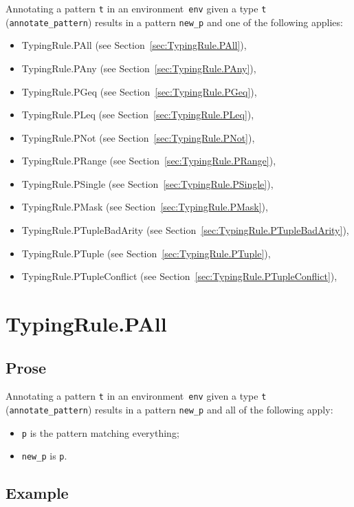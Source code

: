 \documentclass{book}
\begin{document}
Annotating a pattern \texttt{t} in an environment~\texttt{env} given a type \texttt{t} (\texttt{annotate\_pattern}) results in a pattern \texttt{new\_p} and one of the following applies:
\begin{itemize}
\item TypingRule.PAll (see Section~\ref{sec:TypingRule.PAll}),
\item TypingRule.PAny (see Section~\ref{sec:TypingRule.PAny}),
\item TypingRule.PGeq (see Section~\ref{sec:TypingRule.PGeq}),
\item TypingRule.PLeq (see Section~\ref{sec:TypingRule.PLeq}),
\item TypingRule.PNot (see Section~\ref{sec:TypingRule.PNot}),
\item TypingRule.PRange (see Section~\ref{sec:TypingRule.PRange}),
\item TypingRule.PSingle (see Section~\ref{sec:TypingRule.PSingle}),
\item TypingRule.PMask (see Section~\ref{sec:TypingRule.PMask}),
\item TypingRule.PTupleBadArity (see Section~\ref{sec:TypingRule.PTupleBadArity}),
\item TypingRule.PTuple (see Section~\ref{sec:TypingRule.PTuple}),
\item TypingRule.PTupleConflict (see Section~\ref{sec:TypingRule.PTupleConflict}),
\end{itemize}

\section{TypingRule.PAll \label{sec:TypingRule.PAll}}

  \subsection{Prose}
   Annotating a pattern \texttt{t} in an environment~\texttt{env} given a type \texttt{t} (\texttt{annotate\_pattern}) results in a pattern \texttt{new\_p} and all of the following apply:
   \begin{itemize}
   \item \texttt{p} is the pattern matching everything;
   \item \texttt{new\_p} is \texttt{p}.
   \end{itemize}

  \subsection{Example}
\end{document}

